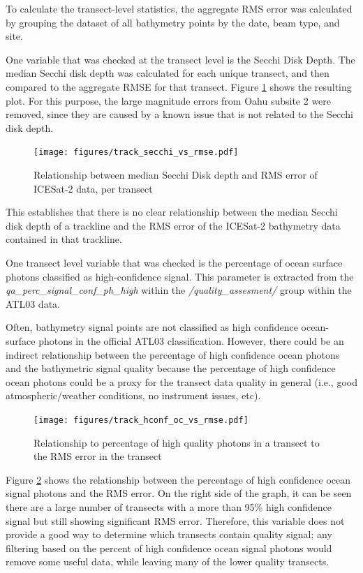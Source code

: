 To calculate the transect-level statistics, the aggregate RMS error was calculated by grouping the dataset of all bathymetry points by the date, beam type, and site. 

One variable that was checked at the transect level is the Secchi Disk Depth. The median Secchi disk depth was calculated for each unique transect, and then compared to the aggregate RMSE for that transect. Figure \ref{fig:transect-rmse-zsd} shows the resulting plot. For this purpose, the large magnitude errors from Oahu subsite 2 were removed, since they are caused by a known issue that is not related to the Secchi disk depth.

\begin{figure}[htbp]
    \centering
    \texttt{[image: figures/track\_secchi\_vs\_rmse.pdf]}
    \caption{Relationship between median Secchi Disk depth and RMS error of ICESat-2 data, per transect}
    \label{fig:transect-rmse-zsd}
\end{figure}

This establishes that there is no clear relationship between the median Secchi disk depth of a trackline and the RMS error of the ICESat-2 bathymetry data contained in that trackline.

One transect level variable that was checked is the percentage of ocean surface photons classified as high-confidence signal. This parameter is extracted from the \emph{qa\_perc\_signal\_conf\_ph\_high} within the \emph{/quality\_assesment/} group within the ATL03 data.

Often, bathymetry signal points are not classified as high confidence ocean-surface photons in the official ATL03 classification. However, there could be an indirect relationship between the percentage of high confidence ocean photons and the bathymetric signal quality because the percentage of high confidence ocean photons could be a proxy for the transect data quality in general (i.e., good atmospheric/weather conditions, no instrument issues, etc).


\begin{figure}[htbp]
    \centering
    \texttt{[image: figures/track\_hconf\_oc\_vs\_rmse.pdf]}
    \caption{Relationship to percentage of high quality photons in a transect to the RMS error in the transect}
    \label{fig:transect-phconf-rmse}
\end{figure}

Figure \ref{fig:transect-phconf-rmse} shows the relationship between the percentage of high confidence ocean signal photons and the RMS error. On the right side of the graph, it can be seen there are a large number of transects with a more than 95\% high confidence signal but still showing significant RMS error. Therefore, this variable does not provide a good way to determine which transects contain quality signal; any filtering based on the percent of high confidence ocean signal photons would remove some useful data, while leaving many of the lower quality transects. 

